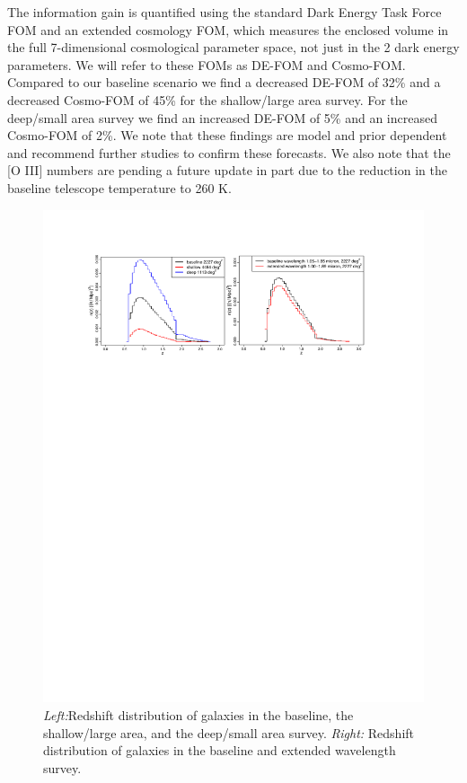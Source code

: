 The information gain is quantified using the standard Dark Energy Task Force FOM and an extended cosmology FOM, which measures the enclosed volume in the full 7-dimensional cosmological parameter space, not just in the 2 dark energy parameters. We will refer to these FOMs as DE-FOM and Cosmo-FOM. Compared to our baseline scenario we find a decreased DE-FOM of 32\% and a decreased Cosmo-FOM of 45\% for the shallow/large area survey. For the deep/small area survey we find an increased DE-FOM of 5\% and an increased Cosmo-FOM of 2\%. We note that these findings are model and prior dependent and recommend further studies to confirm these forecasts. We also note that the [O III] numbers are pending a future update in part due to the reduction in the baseline telescope temperature to 260 K.
\begin{figure}
  \includegraphics[width=16.0cm]{Plots/forecasts/HLSS_forecasts}
    \caption{\textit{Left:}Redshift distribution of galaxies in the baseline, the shallow/large area, and the deep/small area survey. \textit{Right:} Redshift distribution of galaxies in the baseline and extended wavelength survey.
}
  \label{fi:forecast1}
\end{figure}

